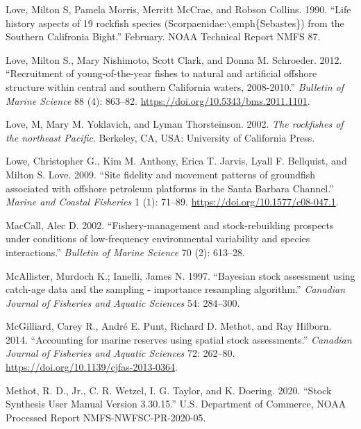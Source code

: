 \documentclass[
  english,
  a4paper,
]{article}
\newlength{\cslhangindent}
\newlength{\cslentryspacingunit} %
\newenvironment{CSLReferences}[2] %
 {%
  \setlength{\parindent}{0pt}
  \ifodd #1
  \let\oldpar\par
  \def\par{\hangindent=\cslhangindent\oldpar}
  \fi
  \setlength{\parskip}{#2\cslentryspacingunit}
 }%
 {}
\begin{document}
\begin{CSLReferences}{1}{0}
\leavevmode{}%
Love, Milton S, Pamela Morris, Merritt McCrae, and Robson Collins. 1990. {``{Life history aspects of 19 rockfish species (Scorpaenidae:\(\backslash\)emph{\{}Sebastes{\}}) from the Southern Califronia Bight}.''} February. NOAA Technical Report NMFS 87.

\leavevmode{}%
Love, Milton S., Mary Nishimoto, Scott Clark, and Donna M. Schroeder. 2012. {``{Recruitment of young-of-the-year fishes to natural and artificial offshore structure within central and southern California waters, 2008-2010}.''} \emph{Bulletin of Marine Science} 88 (4): 863--82. \url{https://doi.org/10.5343/bms.2011.1101}.

\leavevmode{}%
Love, M, Mary M. Yoklavich, and Lyman Thorsteinson. 2002. \emph{{The rockfishes of the northeast Pacific}}. Berkeley, CA, USA: University of California Press.

\leavevmode{}%
Lowe, Christopher G., Kim M. Anthony, Erica T. Jarvis, Lyall F. Bellquist, and Milton S. Love. 2009. {``{Site fidelity and movement patterns of groundfish associated with offshore petroleum platforms in the Santa Barbara Channel}.''} \emph{Marine and Coastal Fisheries} 1 (1): 71--89. \url{https://doi.org/10.1577/c08-047.1}.

\leavevmode{}%
MacCall, Alec D. 2002. {``{Fishery-management and stock-rebuilding prospects under conditions of low-frequency environmental variability and species interactions}.''} \emph{Bulletin of Marine Science} 70 (2): 613--28.

\leavevmode{}%
McAllister, Murdoch K.; Ianelli, James N. 1997. {``{Bayesian stock assessment using catch-age data and the sampling - importance resampling algorithm}.''} \emph{Canadian Journal of Fisheries and Aquatic Sciences} 54: 284--300.

\leavevmode{}%
McGilliard, Carey R., André E. Punt, Richard D. Methot, and Ray Hilborn. 2014. {``{Accounting for marine reserves using spatial stock assessments}.''} \emph{Canadian Journal of Fisheries and Aquatic Sciences} 72: 262--80. \url{https://doi.org/10.1139/cjfas-2013-0364}.

\leavevmode{}%
Methot, R. D., Jr., C. R. Wetzel, I. G. Taylor, and K. Doering. 2020. {``{Stock Synthesis User Manual Version 3.30.15}.''} U.S. Department of Commerce, NOAA Processed Report NMFS-NWFSC-PR-2020-05.


\end{CSLReferences}
\end{document}
